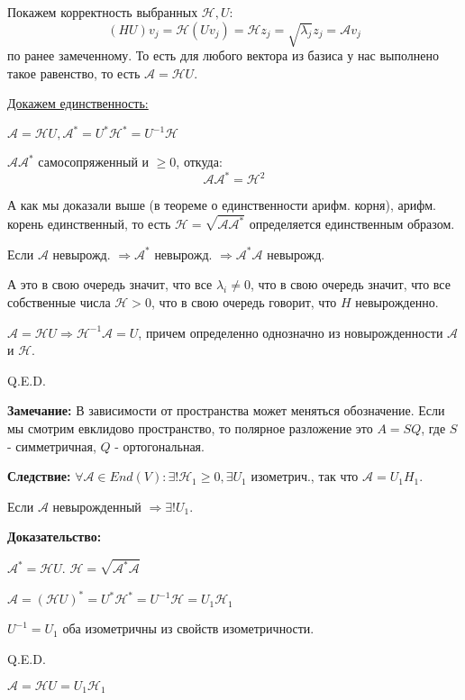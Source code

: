 Покажем корректность выбранных $\mathcal{H},U$:
$$(HU)v_j = \mathcal{H}(U v_j) = \mathcal{H}z_j =\sqrt{\lambda_j}z_j = \mathcal{A}v_j$$
по ранее замеченному. То есть для любого вектора из базиса у нас выполнено такое равенство, то есть $\mathcal{A} = \mathcal{H} U$.

\uline{Докажем единственность:}

$\mathcal{A} = \mathcal{H} U, \mathcal{A}^* = U^* \mathcal{H}^* = U^{-1}\mathcal{H}$

$\mathcal{A}\mathcal{A}^*$ самосопряженный и $\geq 0$, откуда:
$$\mathcal{A}\mathcal{A}^* = \mathcal{H}^2 $$

А как мы доказали выше (в теореме о единственности арифм. корня), арифм. корень единственный, то есть $\mathcal{H} = \sqrt{\mathcal{A A}^*}$ определяется единственным образом.

Если $\mathcal{A}$ невырожд. $\Rightarrow \mathcal{A}^*$ невырожд. $\Rightarrow \mathcal{A}^* \mathcal{A}$ невырожд.

А это в свою очередь значит, что все $\lambda_i \neq 0$, что  в свою очередь значит, что все собственные числа $\mathcal{H} >0$, что в свою очередь говорит, что $H$ невырожденно.

$\mathcal{A} = \mathcal{H}U \Rightarrow \mathcal{H}^{-1}\mathcal{A} = U$, причем определенно однозначно из новырожденности $\mathcal{A}$ и $\mathcal{H}$.


\hfill Q.E.D.

\textbf{Замечание:} В зависимости от пространства может меняться обозначение. Если мы смотрим евклидово пространство, то полярное разложение это $A = SQ$, где $S$ - симметричная, $Q$ - ортогональная.

\textbf{Следствие:} $\forall \mathcal{A}\in End(V): \exists! \mathcal{H}_1 \geq 0, \exists U_1$ изометрич., так что $\mathcal{A} = U_1H_1$.

Если $\mathcal{A}$ невырожденный $\Rightarrow \exists! U_1$.

\textbf{Доказательство:}

$\mathcal{A}^* = \mathcal{H}U$. $\mathcal{H} = \sqrt{\mathcal{A}^*\mathcal{A}}$

$\mathcal{A} = (\mathcal{H}U)^* = U^* \mathcal{H}^* = U^{-1}\mathcal{H} = U_1\mathcal{H}_1$

$U^{-1} = U_1$ оба изометричны из свойств изометричности.

\hfill Q.E.D.

$\mathcal{A} = \mathcal{H} U = U_1 \mathcal{H}_1$

